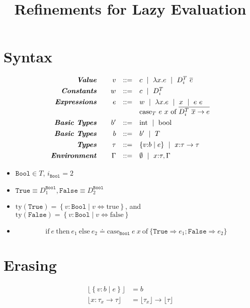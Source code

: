 \documentclass[10pt,a4paper]{article}
\title{Refinements for Lazy Evaluation}
\newcommand\dcti{\dct{i}}
\newcommand\dct[1]{\ensuremath{D^T_{#1}}}
\newcommand\efun[2]{\ensuremath{\lambda #1 . #2}}
\newcommand\eapp[2]{\ensuremath{#1 \ #2}}
\newcommand\edata[2]{\ensuremath{#1 \ #2}}
\newcommand\ecase[5]{\ensuremath{\text{case}_T\ #1\ #2\ \text{of}\ \overline{\edata{#3}{#4} \rightarrow #5}}}
\newcommand\etrue{\ensuremath{\text{true}}}
\newcommand\efalse{\ensuremath{\text{false}}}
\newcommand\tint{\ensuremath{\text{int}}}
\newcommand\tbool{\ensuremath{\text{bool}}}
\newcommand\tref[3]{\ensuremath{\left\lbrace {#1} \colon {#2} \mid {#3} \right\rbrace}}
\newcommand\tconref[4]{\tref{#3}{\tcon{#1}{#2}}{#4}}
\newcommand\tcon[2]{\ensuremath{#1\ #2}}
\newcommand\tfun[3]{\ensuremath{#1\colon #2 \rightarrow #3}}
\newcommand\ty[1]{\ensuremath{\text{ty}({#1})}}
\newcommand\erase[1]{\ensuremath{\lfloor #1 \rfloor}}
\begin{document}
\section*{Syntax}
$$
\begin{array}{rrcl}
\emphbf{Value} \quad 
  & v
  & ::= 
  &   	 c 
  \spmid \efun{x}{e} 
  \spmid \edata{\dcti}{\overline{e}}
  \\[0.05in] 

\emphbf{Constants} \quad 
  & w
  & ::= 
  &   	 c 
  \spmid \dcti 
  \\[0.05in] 

\emphbf{Expressions} \quad 
  & e
  & ::= 
  &   	 w
  \spmid \efun{x}{e} 
  \spmid x 
  \spmid \eapp{e}{e}  
  \\ &&& \ecase{e}{x}{\dcti}{\overline{x}}{e}
  \\[0.05in] 

\emphbf{Basic Types} \quad 
  & b'
  & ::=  
  & 	\tint \spmid \tbool 
  \\[0.05in] 

\emphbf{Basic Types} \quad 
  & b
  & ::=  
  & 	b' \spmid T
  \\[0.05in] 

\emphbf{Types} \quad 
  & \tau
  & ::=  
  & 	\tref{v}{b}{e}
  \spmid \tfun{x}{\tau}{\tau}    
  \\[0.05in] 

\emphbf{Environment} \quad 
  & \Gamma
  & ::= 
  &     \emptyset \spmid x\colon \tau, \Gamma

\end{array}
$$

\begin{itemize}
\item $\texttt{Bool}\in T$, $i_\texttt{Bool} = 2$
\item $\texttt{True}  \equiv D^{\texttt{Bool}}_1, \texttt{False} \equiv D^{\texttt{Bool}}_2$
\item $\ty{\texttt{True}} = \tref{v}{\texttt{Bool}}{v \Leftrightarrow \etrue}$, and
$\ty{\texttt{False}} = \tref{v}{\texttt{Bool}}{v \Leftrightarrow \efalse}$
\item
$$\text{if}\ e\ \text{then}\ e_1\ \text{else}\ e_2 \doteq 
\text{case}_{\texttt{Bool}}\ e\ x\ \text{of}\ \{\texttt{True}\Rightarrow e_1;\texttt{False}\Rightarrow e_2 \}
$$
\end{itemize}
\section*{Erasing}
\begin{align*}
\erase{\tref{v}{b}{e}}&=b\\
\erase{\tfun{x}{\tau_x}{\tau}}&= \erase{\tau_x} \rightarrow \erase{\tau}\\
\end{align*}
\end{document}
